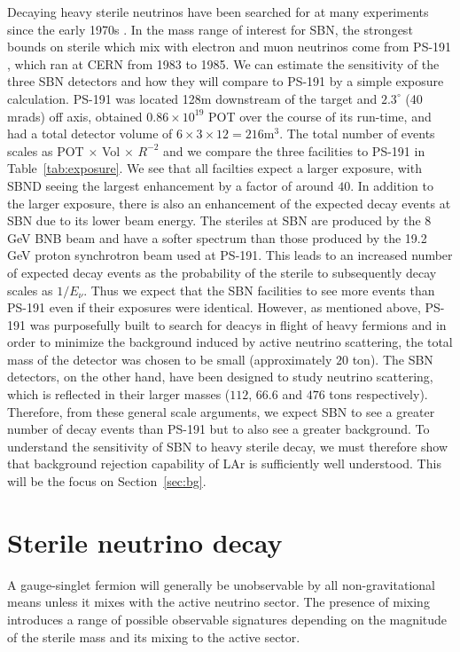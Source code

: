 \documentclass[11pt, a4paper]{article}
\newcommand{\refsec}[1]{Section~\ref{#1}}
\newcommand{\reftab}[1]{Table~\ref{#1}}
\begin{document}
Decaying heavy sterile neutrinos have been searched for at many experiments
since the early 1970s \cite{}. In the mass range of interest for SBN, the
strongest bounds on sterile which mix with electron and muon neutrinos come
from PS-191 \cite{Bernardi:1985ny}, which ran at CERN from 1983 to 1985. 
% 
We can estimate the sensitivity of the three SBN detectors and how they will
compare to PS-191 by a simple exposure calculation. PS-191 was located 128m
downstream of the target and $2.3^\circ$ (40 mrads) off axis, obtained $0.86
\times 10^{19}$ POT over the course of its run-time, and had a total detector
volume of $6\times3\times12 = 216 \text{m}^3$. The total number of events
scales as POT $\times$ Vol $\times$ $R^{-2}$ and we compare the three
facilities to PS-191 in \reftab{tab:exposure}. We see that all facilties expect
a larger exposure, with SBND seeing the largest enhancement by a factor of
around $40$.
%
In addition to the larger exposure, there is also an enhancement of the
expected decay events at SBN due to its lower beam energy. The steriles at SBN
are produced by the 8 GeV BNB beam and have a softer spectrum than those
produced by the 19.2 GeV proton synchrotron beam used at PS-191. This leads to
an increased number of expected decay events as the probability of the sterile
to subsequently decay scales as $1/E_\nu$. Thus we expect that the SBN
facilities to see more events than PS-191 even if their exposures were
identical. 
%
However, as mentioned above, PS-191 was purposefully built to search for deacys
in flight of heavy fermions and in order to minimize the background induced by
active neutrino scattering, the total mass of the detector was chosen to be
small (approximately $20$ ton). The SBN detectors, on the other hand, have been
designed to study neutrino scattering, which is reflected in their larger
masses ($112$, $66.6$ and $476$ tons respectively). Therefore, from these
general scale arguments, we expect SBN to see a greater number of decay events
than PS-191 but to also see a greater background. 
%
To understand the sensitivity of SBN to heavy sterile decay, we must therefore
show that background rejection capability of LAr is sufficiently well
understood. This will be the focus on \refsec{sec:bg}.

\section{Sterile neutrino decay}

A gauge-singlet fermion will generally be unobservable by all non-gravitational
means unless it mixes with the active neutrino sector. The presence of mixing
introduces a range of possible observable signatures depending on the magnitude
of the sterile mass and its mixing to the active sector. 
\end{document}
